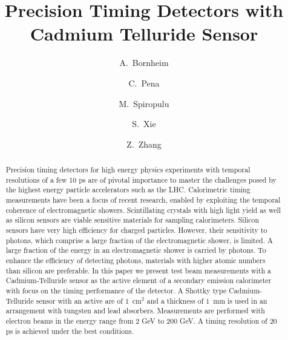 \documentclass[preprint,1p]{elsarticle}
\begin{document}
\linenumbers

\begin{frontmatter}



\title{Precision Timing Detectors with Cadmium Telluride Sensor}


\author[1]{A.~Bornheim}
\author[1]{C.~Pena}
\author[1]{M.~Spiropulu}
\author[1,cor]{S.~Xie}
\author[1]{Z.~Zhang}
\address[1]{California Institute of Technology, Pasadena, CA, USA}

\begin{abstract}


\end{abstract}
\begin{abstract}
Precision timing detectors for high energy physics experiments with temporal resolutions of a few 10 ps are
of pivotal importance to master the challenges posed by the highest energy particle accelerators such as the LHC.
Calorimetric timing measurements have been a focus of recent research, enabled by exploiting the temporal 
coherence of electromagnetic showers. Scintillating crystals with high light yield as well as silicon sensors
are viable sensitive materials for sampling calorimeters. Silicon sensors have very high efficiency for 
charged particles. However, their sensitivity to photons, which comprise a large fraction of the
electromagnetic shower, is limited. A large fraction of the energy in an electromagnetic shower is carried by photons.
To enhance the efficiency of detecting photons, materials with higher atomic numbers than silicon 
are preferable.  In this paper we present test beam measurements with a Cadmium-Telluride sensor as 
the active element of a secondary emission calorimeter with focus on the timing performance of the detector. 
A Shottky type Cadmium-Telluride sensor with an active are of $1$~$\mathrm{cm}^{2}$ and a thickness of $1$~mm 
is used in an arrangement with tungsten and lead absorbers. Measurements are performed with electron beams 
in the energy range from 2 GeV to 200 GeV. A timing resolution of 20 ps is achieved under the best conditions.
\end{abstract}



\end{frontmatter}
\end{document}
